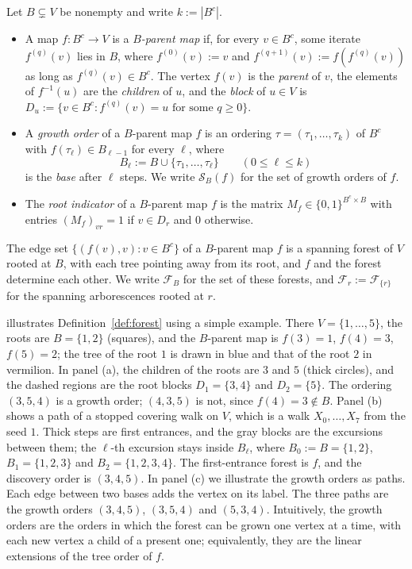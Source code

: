 \documentclass[onefignum,onetabnum,nohypdvips]{siamart250211}
\numberwithin{theorem}{section}
\numberwithin{equation}{section}
\newcommand{\Orders}{\mathcal{S}}
\newcommand{\Fset}{\mathcal{F}}
\begin{document}
\begin{definition}\label{def:forest}
Let $B\subsetneq V$ be nonempty and write $k:=|B^c|$.
\begin{itemize}
\item[(a)] A map $f:B^c\to V$ is a \emph{$B$-parent map} if, for every
$v\in B^c$, some iterate $f^{(q)}(v)$ lies in $B$, where $f^{(0)}(v):=v$
and $f^{(q+1)}(v):=f(f^{(q)}(v))$ as long as $f^{(q)}(v)\in B^c$. The
vertex $f(v)$ is the \emph{parent} of $v$, the elements of
$f^{-1}(u)$ are the \emph{children} of $u$, and the \emph{block} of
$u\in V$ is $D_u:=\{v\in B^c:f^{(q)}(v)=u\text{ for some }q\ge0\}$.
\item[(b)] A \emph{growth order} of a $B$-parent map $f$ is an ordering
$\tau=(\tau_1,\dots,\tau_k)$ of $B^c$ with $f(\tau_\ell)\in B_{\ell-1}$ for
every $\ell$, where
\begin{equation}\label{eq:base}
B_\ell:=B\cup\{\tau_1,\dots,\tau_\ell\}\qquad(0\le \ell\le k)
\end{equation}
is the \emph{base} after $\ell$ steps. We write $\Orders_B(f)$ for the
set of growth orders of $f$.
\item[(c)] The \emph{root indicator} of a $B$-parent map $f$ is the matrix
$M_f\in\{0,1\}^{B^c\times B}$ with entries $(M_f)_{vr}=1$ if
$v\in D_r$ and $0$ otherwise.
\end{itemize}
\end{definition}


The edge set $\{(f(v),v):v\in B^c\}$ of a $B$-parent map $f$ is a spanning
forest of $V$ rooted at $B$, with each tree pointing away from its
root, and $f$ and the forest determine each other. We write $\Fset_B$
for the set of these forests, and $\Fset_r:=\Fset_{\{r\}}$ for the
spanning arborescences rooted at $r$.

 illustrates Definition~\ref{def:forest} using a simple example. There $V=\{1,\dots,5\}$, the roots are
$B=\{1,2\}$ (squares), and the $B$-parent map is $f(3)=1$, $f(4)=3$,
$f(5)=2$; the tree of the root $1$ is drawn in blue and that of the root
$2$ in vermilion. In panel (a), the children of the
roots are $3$ and $5$ (thick circles), and the dashed regions are the
root blocks $D_1=\{3,4\}$ and $D_2=\{5\}$. The ordering $(3,5,4)$ is a
growth order; $(4,3,5)$ is not, since $f(4)=3\notin B$. Panel (b) shows a path of a stopped covering walk on $V$, which is a walk $X_0,\dots,X_7$ from the seed $1$. Thick steps are first entrances, and the gray blocks are the excursions between them; the $\ell$-th excursion stays inside $B_\ell$, where $B_0:=B=\{1,2\}$,
$B_1=\{1,2,3\}$ and $B_2=\{1,2,3,4\}$. The first-entrance forest is $f$,
and the discovery order is $(3,4,5)$. In panel (c) we illustrate the growth orders as paths. Each edge between two bases adds the vertex on its label. The three paths are the growth orders $(3,4,5)$, $(3,5,4)$ and $(5,3,4)$. Intuitively, the growth orders are the orders in which the forest can be grown one vertex at a time, with each new vertex a child of a present one; equivalently, they are the linear extensions of the tree order of $f$.
\end{document}
